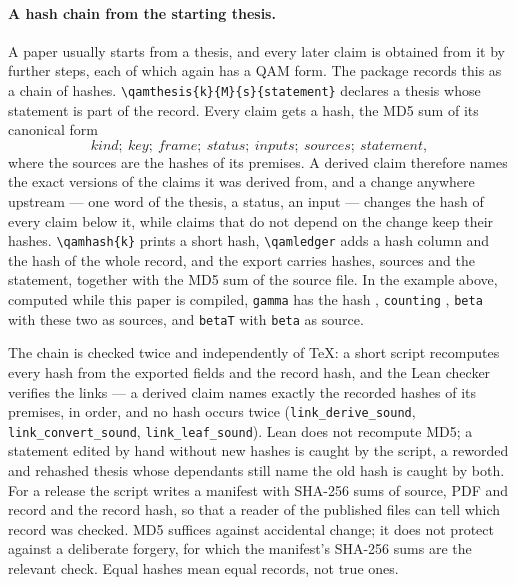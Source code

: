 \paragraph{A hash chain from the starting thesis.}  A paper usually starts from a thesis, and every later claim is obtained from it by
further steps, each of which again has a QAM form.  The package records this as a chain of hashes.  \verb|\qamthesis{k}{M}{s}{statement}|
declares a thesis whose statement is part of the record.  Every claim gets a hash, the MD5 sum of its canonical form
\[
  \textit{kind};\ \textit{key};\ \textit{frame};\ \textit{status};\ \textit{inputs};\ \textit{sources};\ \textit{statement},
\]
where the sources are the hashes of its premises.  A derived claim therefore names the exact versions of the claims it was derived from,
and a change anywhere upstream --- one word of the thesis, a status, an input --- changes the hash of every claim below it, while claims
that do not depend on the change keep their hashes.  \verb|\qamhash{k}| prints a short hash, \verb|\qamledger| adds a hash column and the
hash of the whole record, and the export carries hashes, sources and the statement, together with the MD5 sum of the source file.  In the
example above, computed while this paper is compiled, \texttt{gamma} has the hash \texttt{}, \texttt{counting}
\texttt{}, \texttt{beta} \texttt{} with these two as sources, and \texttt{betaT}
\texttt{} with \texttt{beta} as source.

The chain is checked twice and independently of \TeX{}: a short script recomputes every hash from the exported fields and the record hash,
and the Lean checker verifies the links --- a derived claim names exactly the recorded hashes of its premises, in order, and no hash occurs
twice (\texttt{link\_derive\_sound}, \texttt{link\_convert\_sound}, \texttt{link\_leaf\_sound}).  Lean does not recompute MD5; a statement
edited by hand without new hashes is caught by the script, a reworded and rehashed thesis whose dependants still name the old hash is caught
by both.  For a release the script writes a manifest with SHA-256 sums of source, PDF and record and the record hash, so that a reader of
the published files can tell which record was checked.  MD5 suffices against accidental change; it does not protect against a deliberate
forgery, for which the manifest's SHA-256 sums are the relevant check.  Equal hashes mean equal records, not true ones.

